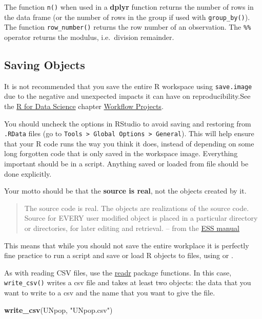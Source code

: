\documentclass[]{book}
\newenvironment{Shaded}{\begin{snugshade}}{\end{snugshade}}
\newcommand{\KeywordTok}[1]{\textcolor[rgb]{0.13,0.29,0.53}{\textbf{#1}}}
\newcommand{\NormalTok}[1]{#1}
\newcommand{\StringTok}[1]{\textcolor[rgb]{0.31,0.60,0.02}{#1}}
\theoremstyle{definition}
\theoremstyle{definition}
\theoremstyle{definition}
\theoremstyle{remark}
\begin{document}
The function \texttt{n()} when used in a \textbf{dplyr} function returns
the number of rows in the data frame (or the number of rows in the group
if used with \texttt{group\_by()}). The function \texttt{row\_number()}
returns the row number of an observation. The \texttt{\%\%} operator
returns the modulus, i.e.~division remainder.

\hypertarget{saving-objects}{%
\subsection{Saving Objects}\label{saving-objects}}

It is not recommended that you save the entire R workspace using
\texttt{save.image} due to the negative and unexpected impacts it can
have on reproducibility.See the \href{http://r4ds.had.co.nz/}{R for Data
Science} chapter
\href{http://r4ds.had.co.nz/workflow-projects.html}{Workflow Projects}.

You should uncheck the options in RStudio to avoid saving and restoring
from \texttt{.RData} files (go to
\texttt{Tools\ \textgreater{}\ Global\ Options\ \textgreater{}\ General}).
This will help ensure that your R code runs the way you think it does,
instead of depending on some long forgotten code that is only saved in
the workspace image. Everything important should be in a script.
Anything saved or loaded from file should be done explicitly.

Your motto should be that the \textbf{source is real}, not the objects
created by it.

\begin{quote}
The source code is real. The objects are realizations of the source
code. Source for EVERY user modified object is placed in a particular
directory or directories, for later editing and retrieval. -- from the
\href{https://ess.r-project.org/Manual/ess.html\#Philosophies-for-using-ESS_0028S_0029}{ESS
manual}
\end{quote}

This means that while you should not save the entire workplace it is
perfectly fine practice to run a script and save or load R objects to
files, using or .

As with reading CSV files, use the
\href{http://readr.tidyverse.org/}{readr} package functions. In this
case, \texttt{write\_csv()} writes a csv file and takes at least two
objects: the data that you want to write to a csv and the name that you
want to give the file.

\begin{Shaded}
\begin{Highlighting}[]
\KeywordTok{write_csv}\NormalTok{(UNpop, }\StringTok{"UNpop.csv"}\NormalTok{)}
\end{Highlighting}
\end{Shaded}
\end{document}
